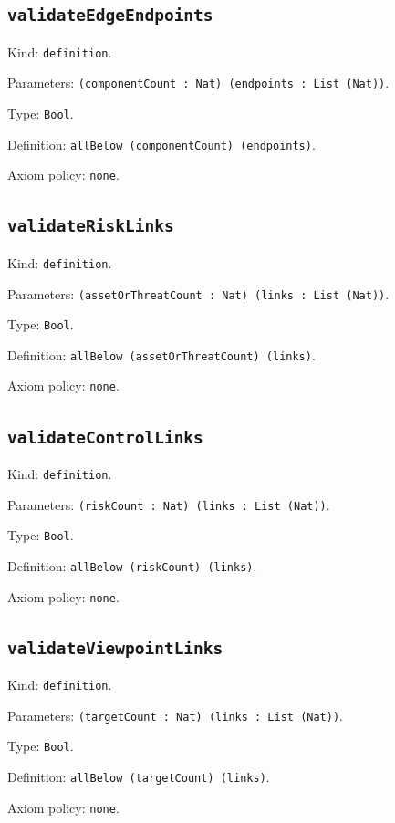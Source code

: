 \documentclass[11pt]{article}
\begin{document}
\subsection*{\texttt{validateEdgeEndpoints}}
\noindent Kind: \texttt{definition}.\par
\noindent Parameters: \texttt{(componentCount : Nat) (endpoints : List (Nat))}.\par
\noindent Type: \texttt{Bool}.\par
\noindent Definition: \texttt{allBelow (componentCount) (endpoints)}.\par
\noindent Axiom policy: \texttt{none}.\par
\subsection*{\texttt{validateRiskLinks}}
\noindent Kind: \texttt{definition}.\par
\noindent Parameters: \texttt{(assetOrThreatCount : Nat) (links : List (Nat))}.\par
\noindent Type: \texttt{Bool}.\par
\noindent Definition: \texttt{allBelow (assetOrThreatCount) (links)}.\par
\noindent Axiom policy: \texttt{none}.\par
\subsection*{\texttt{validateControlLinks}}
\noindent Kind: \texttt{definition}.\par
\noindent Parameters: \texttt{(riskCount : Nat) (links : List (Nat))}.\par
\noindent Type: \texttt{Bool}.\par
\noindent Definition: \texttt{allBelow (riskCount) (links)}.\par
\noindent Axiom policy: \texttt{none}.\par
\subsection*{\texttt{validateViewpointLinks}}
\noindent Kind: \texttt{definition}.\par
\noindent Parameters: \texttt{(targetCount : Nat) (links : List (Nat))}.\par
\noindent Type: \texttt{Bool}.\par
\noindent Definition: \texttt{allBelow (targetCount) (links)}.\par
\noindent Axiom policy: \texttt{none}.\par
\end{document}

